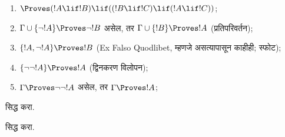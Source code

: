 \documentclass[../../../include/open-logic-section]{subfiles}
\begin{document}
\begin{prop}
\begin{enumerate}
\item $\Proves (!A \lif !B) \lif ((!B \lif !C)
  \lif (!A \lif !C))$; 
\item $\Gamma \cup \{ \lnot !A\}
  \Proves \lnot !B$ असेल, तर $\Gamma \cup \{ !B\} \Proves
  !A$ (प्रतिपरिवर्तन); 
\item  $\{ !A, \lnot!A\} \Proves
    !B$ (Ex Falso Quodlibet, म्हणजे असत्यापासून काहीही; स्फोट); 
\item  $\{ \lnot\lnot!A\} \Proves
  !A$ (द्विनकरण विलोपन);
\item $\Gamma \Proves \lnot\lnot!A$ असेल, तर $\Gamma \Proves
  !A$;
\end{enumerate}
\end{prop}

\begin{prob}
   सिद्ध करा.
\end{prob}
\tagendprob

\begin{prob}
   सिद्ध करा.
\end{prob}
\tagendprob
\end{document}
